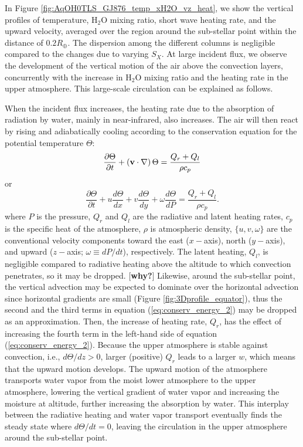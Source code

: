 \documentclass[11pt,numberedappendix,twocolappendix,]{emulateapj}
\def\water{H$_2$O }
\def\memo#1{\color{red}$[${\bf #1}$]$ \color{black}}
\begin{document}
In Figure \ref{fig:AqOH0TLS_GJ876_temp_xH2O_vz_heat}, we show the vertical  profiles of temperature, \water mixing ratio, short wave heating rate, and the upward velocity, averaged over the region around the sub-stellar point within the distance of $0.2R_{\oplus }$. 
The dispersion among the different columns is negligible compared to the changes due to varying $S_X$. 
At large incident flux, we observe the development of the vertical motion of the air above the convection layers, concurrently with the increase in \water mixing ratio and the heating rate in the upper atmosphere. 
This large-scale circulation can be explained as follows. 

When the incident flux increases, the heating rate due to the absorption of radiation by water, mainly in near-infrared, also increases. 
The air will then react by rising and adiabatically cooling according to the conservation equation for the potential temperature $\Theta $:
\begin{equation}
\frac{\partial \Theta }{\partial t} + ( {\bf v} \cdot \nabla ) \, \Theta = \frac{ Q_r + Q_l }{\rho c_p} \label{eq:conserv_energy}
\end{equation}
or
\begin{equation}
\frac{\partial \Theta }{\partial t} + u \frac{d\Theta }{dx} + v\frac{d\Theta }{dy} + \omega \frac{d\Theta }{dP} = \frac{ Q_r + Q_l }{\rho c_p}. \label{eq:conserv_energy_2}
\end{equation}
where $P$ is the pressure, $Q_r$ and $Q_l$ are the radiative and latent heating rates, $c_p$ is the specific heat of the atmosphere, $\rho $ is atmospheric density, $\{ u, v, \omega \}$ are the conventional velocity components toward the east ($x-$axis), north ($y-$axis), and upward ($z-$axis; $\omega \equiv dP/dt$), respectively. 
The latent heating, $Q_l$, is negligible compared to radiative heating above the altitude to which convection penetrates, so it may be dropped. 
\memo{why?}
Likewise, around the sub-stellar point, the vertical advection may be expected to dominate over the horizontal advection since horizontal gradients are small (Figure \ref{fig:3Dprofile_equator}), thus the second and the third terms in equation (\ref{eq:conserv_energy_2}) may be dropped as an approximation. 
Then, the increase of heating rate, $Q_r$, has the effect of increasing the fourth term in the left-hand side of equation (\ref{eq:conserv_energy_2}). 
Because the upper atmosphere is stable against convection, i.e., $d \Theta / d z > 0 $, larger (positive) $Q_r$ leads to a larger $w$, which means that the upward motion develops. 
The upward motion of the atmosphere transports water vapor from the moist lower atmosphere to the upper atmosphere, lowering the vertical gradient of water vapor and increasing the moisture at altitude, further increasing the absorption by water. 
This interplay between the radiative heating and water vapor transport eventually finds the steady state where $d\Theta/dt = 0$, leaving the  circulation in the upper atmosphere around the sub-stellar point. 
\end{document}
